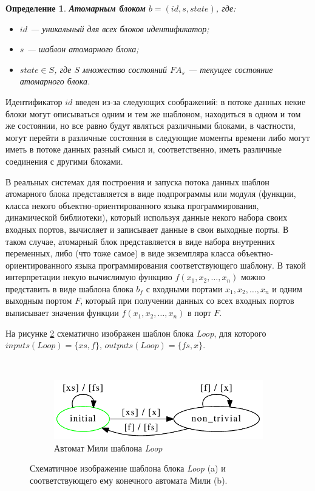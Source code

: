 \documentclass[10pt,a4paper]{article}
\newtheorem{defen}{Определение}
\newcommand{\FA}{F\!A}
\begin{document}
\begin{defen}
  \textbf{Атомарным блоком} $b = (id, s, state)$, где:
  \begin{itemize}
    \item $id$ --- уникальный для всех блоков идентификатор;
    \item $s$ --- шаблон атомарного блока;
    \item $state \in S$, где $S$ множество состояний $\FA_s$ --- текущее состояние атомарного блока.
  \end{itemize}
\end{defen}

Идентификатор $id$ введен из-за следующих соображений: в потоке данных некие блоки могут описываться одним и тем же шаблоном, находиться в одном и том же состоянии,
но все равно будут являться различными блоками, в частности, могут перейти в различные состояния в следующие моменты времени либо могут иметь в потоке данных разный смысл и,
соответственно, иметь различные соединения с другими блоками.

В реальных системах для построения и запуска потока данных шаблон атомарного блока представляется в виде подпрограммы или модуля
(функции, класса некого объектно-ориентированного языка программирования, динамической библиотеки), который используя данные некого набора своих входных портов,
вычисляет и записывает данные в свои выходные порты. В таком случае, атомарный блок представляется в виде набора внутренних переменных,
либо (что тоже самое) в виде экземпляра класса объектно-ориентированного языка программирования соответствующего шаблону.
В такой интерпретации некую вычислимую функцию $f(x_1, x_2, \dots, x_n)$ можно представить в виде шаблона блока $b_f$
с входными портами $x_1, x_2, \dots, x_n$ и одним выходным портом $F$, который при получении данных со всех входных портов
выписывает значения функции $f(x_1, x_2, \dots, x_n)$ в порт $F$.

На рисунке \ref{map} схематично изображен шаблон блока \textit{Loop}, для которого $inputs(Loop) = \{xs, f\}$, $outputs(Loop) = \{fs, x\}$.

\begin{figure}[H]
  \centering

  \begin{subfigure}[b]{0.2\textwidth}
	
  \end{subfigure}
  ~
  \begin{subfigure}[b]{0.7\textwidth}
    \centering
    \includegraphics[width=\textwidth]{map_fa.pdf}
    \caption{Автомат Мили шаблона \textit{Loop}}
    \label{map:fa}
  \end{subfigure}
  
  \caption{Схематичное изображение шаблона блока \textit{Loop} (a) и соответствующего ему конечного автомата Мили (b).}
  \label{map}
\end{figure}
\end{document}
